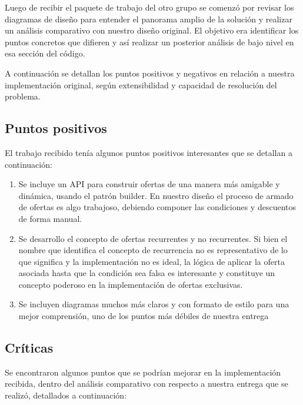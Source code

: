 \documentclass[a4paper,11pt]{article}
\begin{document}
Luego de recibir el paquete de trabajo del otro grupo se comenzó por revisar
los diagramas de diseño para entender el panorama amplio de la solución y
realizar un análisis comparativo con nuestro diseño original. El objetivo era
identificar los puntos concretos que difieren y así realizar un posterior
análisis de bajo nivel en esa sección del código.

A continuación se detallan los puntos positivos y negativos en relación a
nuestra implementación original, según extensibilidad y capacidad de resolución
del problema.

\subsection{Puntos positivos}

El trabajo recibido tenía algunos puntos positivos interesantes que
se detallan a continuación:

\begin{enumerate}

  \item Se incluye un API para construir ofertas de una manera más amigable y
    dinámica, usando el patrón builder. En nuestro diseño el proceso de armado
    de ofertas es algo trabajoso, debiendo componer las condiciones y
    descuentos de forma manual.

  \item Se desarrollo el concepto de ofertas recurrentes y no recurrentes. Si
    bien el nombre que identifica el concepto de recurrencia no es
    representativo de lo que significa y la implementación no es ideal, la
    lógica de aplicar la oferta asociada hasta que la condición sea falsa es
    interesante y constituye un concepto poderoso en la implementación de
    ofertas exclusivas.

  \item Se incluyen diagramas muchos más claros y con formato de estilo para
    una mejor comprensión, uno de los puntos más débiles de nuestra entrega

\end{enumerate}

\subsection{Críticas}

Se encontraron algunos puntos que se podrían mejorar en la implementación
recibida, dentro del análisis comparativo con respecto a nuestra entrega que se
realizó, detallados a continuación:
\end{document}
